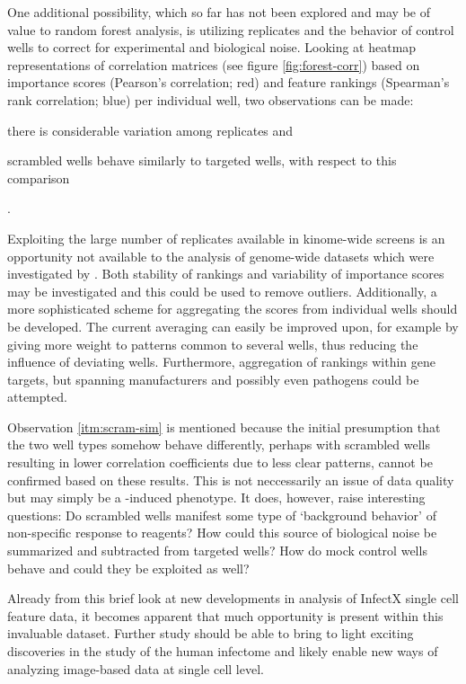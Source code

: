 

One additional possibility, which so far has not been explored and may be of value to random forest analysis, is utilizing replicates and the behavior of control wells to correct for experimental and biological noise. Looking at heatmap representations of correlation matrices (see figure \ref{fig:forest-corr}) based on importance scores (Pearson's correlation; red) and feature rankings (Spearman's rank correlation; blue) per individual well, two observations can be made: \begin{enumerate*}[label=\itshape (\arabic*)] \item there is considerable variation among replicates and \item \label{itm:scram-sim} scrambled wells behave similarly to targeted  wells, with respect to this comparison \end{enumerate*}.

Exploiting the large number of replicates available in kinome-wide screens is an opportunity not available to the analysis of genome-wide datasets which were investigated by \citeauthor{Drewek2015}. Both stability of rankings and variability of importance scores may be investigated and this could be used to remove outliers. Additionally, a more sophisticated scheme for aggregating the scores from individual wells should be developed. The current averaging can easily be improved upon, for example by giving more weight to patterns common to several wells, thus reducing the influence of deviating wells. Furthermore, aggregation of rankings within gene targets, but spanning manufacturers and possibly even pathogens could be attempted.

Observation \ref{itm:scram-sim} is mentioned because the initial presumption that the two well types somehow behave differently, perhaps with scrambled wells resulting in lower correlation coefficients due to less clear patterns, cannot be confirmed based on these results. This is not neccessarily an issue of data quality but may simply be a -induced phenotype. It does, however, raise interesting questions: Do scrambled wells manifest some type of `background behavior' of non-specific response to  reagents? How could this source of biological noise be summarized and subtracted from targeted  wells? How do mock control wells behave and could they be exploited as well?

Already from this brief look at new developments in analysis of InfectX single cell feature data, it becomes apparent that much opportunity is present within this invaluable dataset. Further study should be able to bring to light exciting discoveries in the study of the human infectome and likely enable new ways of analyzing image-based  data at single cell level.